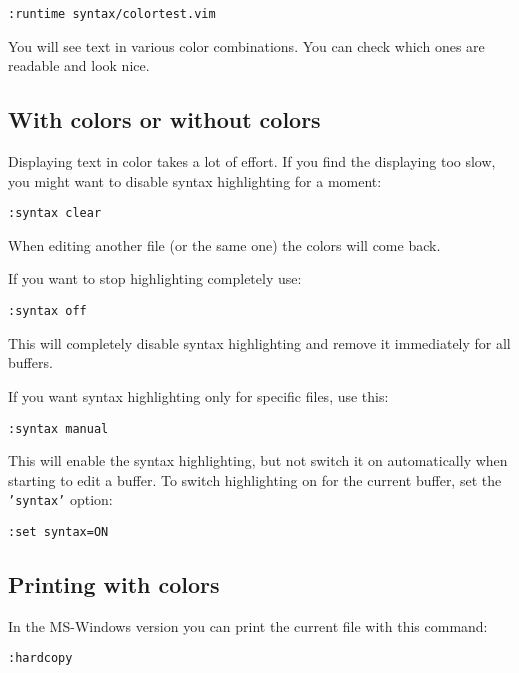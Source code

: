  \begin{Verbatim}[samepage=true]
 :runtime syntax/colortest.vim
 \end{Verbatim}

You will see text in various color combinations.
You can check which ones are readable and look nice.

\subsection{With colors or without colors}

Displaying text in color takes a lot of effort.
If you find the displaying too slow, you might want to disable syntax highlighting for a moment:

\begin{Verbatim}[samepage=true]
 :syntax clear
\end{Verbatim}

When editing another file (or the same one) the colors will come back.

\label{:syn-off}
If you want to stop highlighting completely use:

 \begin{Verbatim}[samepage=true]
 :syntax off
 \end{Verbatim}

This will completely disable syntax highlighting and remove it immediately for all buffers.

\label{:syn-manual}
If you want syntax highlighting only for specific files, use this:

 \begin{Verbatim}[samepage=true]
 :syntax manual
 \end{Verbatim}

This will enable the syntax highlighting, but not switch it on automatically when starting to edit a buffer.
To switch highlighting on for the current buffer, set the \texttt{'syntax'} option:

 \begin{Verbatim}[samepage=true]
 :set syntax=ON
 \end{Verbatim}

\subsection{Printing with colors}
\label{syntax-printing}
In the MS-Windows version you can print the current file with this command:

 \begin{Verbatim}[samepage=true]
 :hardcopy
 \end{Verbatim}

